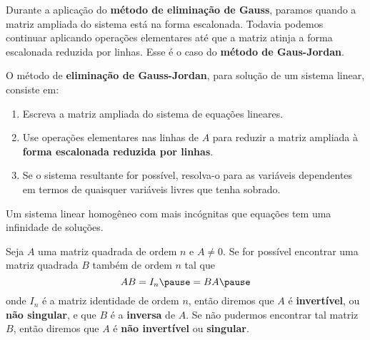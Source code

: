 \documentclass{beamer}
\begin{document}
    \begin{frame}
        Durante a aplicação do \textbf{método de eliminação de Gauss}, \pause paramos quando a matriz ampliada do sistema está na forma escalonada.
        Todavia podemos continuar aplicando operações elementares até que a matriz atinja a forma escalonada reduzida por linhas. Esse é o caso do
        \textbf{método de Gaus-Jordan}.

        \begin{definicao}
            O método de \textbf{eliminação de Gauss-Jordan}, \pause para solução de um sistema linear, consiste em:\pause
            \begin{enumerate}[label={\roman*})]
                \item Escreva a matriz ampliada do sistema de equações lineares.\pause

                \item Use operações elementares nas linhas de $A$ para reduzir a matriz ampliada à \textbf{forma escalonada reduzida por linhas}.\pause

                \item Se o sistema resultante for possível, resolva-o para as variáveis dependentes em termos de quaisquer variáveis livres que tenha sobrado.
            \end{enumerate}
        \end{definicao}
    \end{frame}

    \begin{frame}
        \begin{teorema}
            Um sistema linear homogêneo com mais incógnitas que equações \pause tem uma infinidade de soluções.
        \end{teorema}
    \end{frame}


    \begin{frame}
        \begin{definicao}
            Seja $A$ uma matriz quadrada de ordem $n$ \pause e $A \ne 0$. \pause Se for possível encontrar uma matriz quadrada $B$ \pause também de
            ordem $n$ tal que\pause
            \[
                AB = I_n \pause = BA\pause
            \]
            onde $I_n$ é a matriz identidade de ordem $n$, \pause então diremos que $A$ é \textbf{invertível}, \pause ou \textbf{não singular}, \pause
            e que $B$ é a \textbf{inversa} de $A$. \pause Se não pudermos encontrar tal matriz $B$, \pause então diremos que $A$ é \textbf{não invertível} \pause
            ou \textbf{singular}.
        \end{definicao}
    \end{frame}
\end{document}
